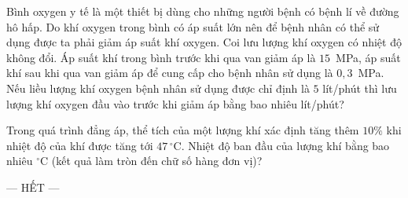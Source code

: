 	\begin{ex}%
		Bình oxygen y tế là một thiết bị dùng cho những người bệnh có bệnh lí về đường hô hấp. Do khí oxygen trong bình có áp suất lớn nên để bệnh nhân có thể sử dụng được ta phải giảm áp suất khí oxygen. Coi lưu lượng khí oxygen có nhiệt độ không đổi. Áp suất khí trong bình trước khi qua van giảm áp là $15$~MPa, áp suất khí sau khi qua van giảm áp để cung cấp cho bệnh nhân sử dụng là $0{,}3$~MPa. Nếu liều lượng khí oxygen bệnh nhân sử dụng được chỉ định là $5$ lít/phút thì lưu lượng khí oxygen đầu vào trước khi giảm áp bằng bao nhiêu lít/phút?
		\par
	\end{ex}

	\begin{ex}%
		Trong quá trình đẳng áp, thể tích của một lượng khí xác định tăng thêm $10\%$ khi nhiệt độ của khí được tăng tới $47\,^\circ\text{C}$. Nhiệt độ ban đầu của lượng khí bằng bao nhiêu $^\circ$C (kết quả làm tròn đến chữ số hàng đơn vị)?
		\par
	\end{ex}

	\centerline{--- HẾT ---}


